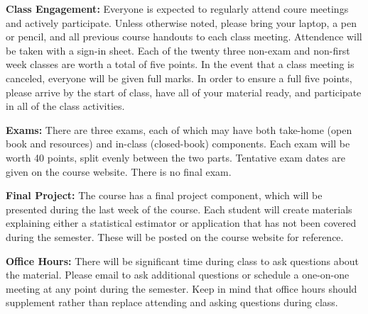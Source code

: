 \documentclass[11pt, a4paper]{article}
\begin{document}
\textbf{Class Engagement:}
Everyone is expected to regularly attend coure meetings and actively
participate. Unless otherwise noted, please bring your laptop, a pen
or pencil, and all previous course handouts to each class meeting.
Attendence will be taken with a sign-in sheet. Each of the twenty three
non-exam and non-first week classes are worth a total of five points. In
the event that a class meeting is canceled, everyone will be given full
marks. In order to ensure a full five points, please arrive by the start
of class, have all of your material ready, and participate in all of the
class activities.

\bigskip

\textbf{Exams:}
There are three exams, each of which may have both take-home (open book
and resources) and in-class (closed-book) components. Each exam will be
worth 40 points, split evenly between the two parts. Tentative exam dates
are given on the course website. There is no final exam.

\bigskip

\textbf{Final Project:}
The course has a final project component, which will be presented during
the last week of the course. Each student will create materials explaining
either a statistical estimator or application that has not been covered
during the semester. These will be posted on the course website for
reference.

\bigskip

\textbf{Office Hours:}
There will be significant time during class to ask questions about
the material. Please email to ask additional questions or schedule a
one-on-one meeting at any point during the semester. Keep in
mind that office hours should supplement rather than replace
attending and asking questions during class.
\end{document}
